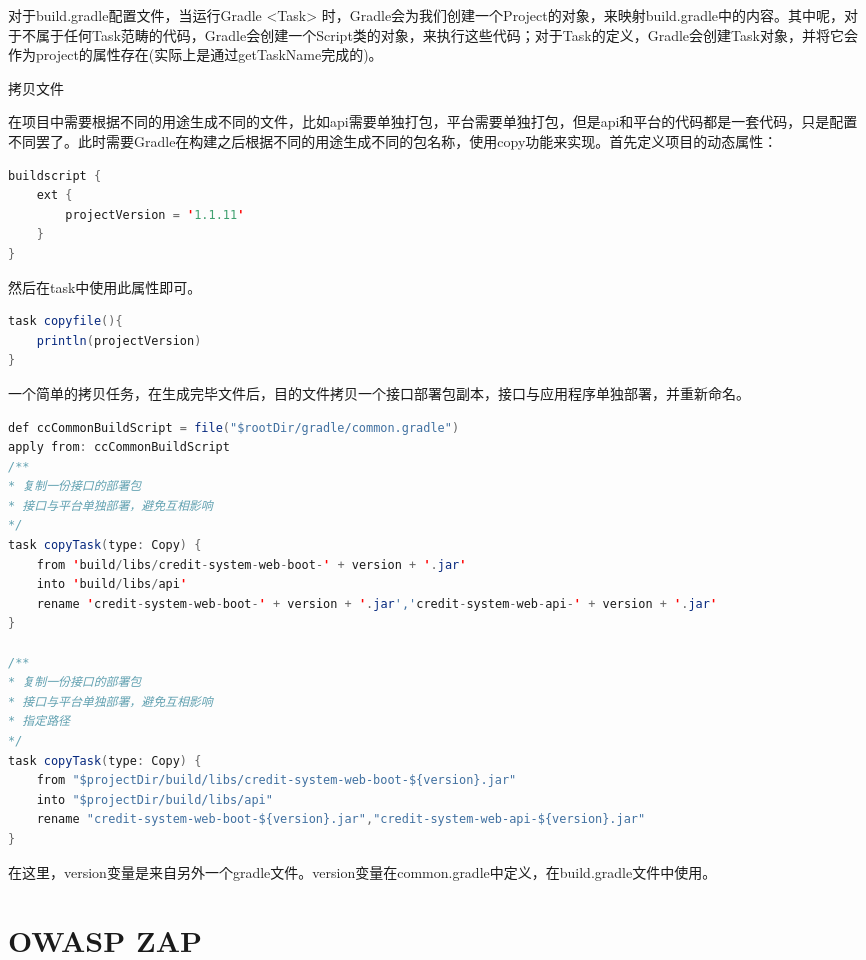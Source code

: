\documentclass[12pt]{book}
\makeatletter
\numberwithin{dummy}{section}
\theoremstyle{ocrenumbox}
\theoremstyle{blacknumex}
\theoremstyle{blacknumbox}
\theoremstyle{ocrenum}
\renewcommand\paragraph{\@startsection{paragraph}{4}{\z@}
	{-2ex \@plus-.2ex \@minus .2ex}
	{.1ex}
	{\normalfont\small\sffamily\bfseries}}
\makeatother
\begin{document}
对于build.gradle配置文件，当运行Gradle <Task> 时，Gradle会为我们创建一个Project的对象，来映射build.gradle中的内容。其中呢，对于不属于任何Task范畴的代码，Gradle会创建一个Script类的对象，来执行这些代码；对于Task的定义，Gradle会创建Task对象，并将它会作为project的属性存在(实际上是通过getTaskName完成的)。


\paragraph{拷贝文件}

在项目中需要根据不同的用途生成不同的文件，比如api需要单独打包，平台需要单独打包，但是api和平台的代码都是一套代码，只是配置不同罢了。此时需要Gradle在构建之后根据不同的用途生成不同的包名称，使用copy功能来实现。首先定义项目的动态属性：

\begin{lstlisting}[language=Java]
buildscript {
	ext {
		projectVersion = '1.1.11'
	}
}
\end{lstlisting}

然后在task中使用此属性即可。

\begin{lstlisting}[language=Java]
task copyfile(){
	println(projectVersion)
}
\end{lstlisting}

一个简单的拷贝任务，在生成完毕文件后，目的文件拷贝一个接口部署包副本，接口与应用程序单独部署，并重新命名。

\begin{lstlisting}[language=Java]
def ccCommonBuildScript = file("$rootDir/gradle/common.gradle")
apply from: ccCommonBuildScript
/**
* 复制一份接口的部署包
* 接口与平台单独部署，避免互相影响
*/
task copyTask(type: Copy) {
	from 'build/libs/credit-system-web-boot-' + version + '.jar'
	into 'build/libs/api'
	rename 'credit-system-web-boot-' + version + '.jar','credit-system-web-api-' + version + '.jar'
}

/**
* 复制一份接口的部署包
* 接口与平台单独部署，避免互相影响
* 指定路径
*/
task copyTask(type: Copy) {
	from "$projectDir/build/libs/credit-system-web-boot-${version}.jar"
	into "$projectDir/build/libs/api"
	rename "credit-system-web-boot-${version}.jar","credit-system-web-api-${version}.jar"
}
\end{lstlisting}

在这里，version变量是来自另外一个gradle文件。version变量在common.gradle中定义，在build.gradle文件中使用。

\chapter{OWASP ZAP}
\end{document}
